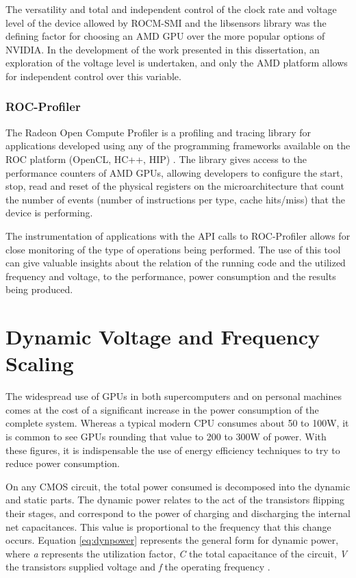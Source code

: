 The versatility and total and independent control of the clock rate and voltage level of the device allowed by ROCM-SMI and the libsensors library was the defining factor for choosing an AMD GPU over the more popular options of NVIDIA. In the development of the work presented in this dissertation, an exploration of the voltage level is undertaken, and only the AMD platform allows for independent control over this variable.

\subsubsection{ROC-Profiler}

The Radeon Open Compute Profiler \cite{noauthor_rocm-developer-tools/rocprofiler_2019} is a profiling and tracing library for applications developed using any of the programming frameworks available on the ROC platform (OpenCL, HC++, HIP) \cite{sun_evaluating_2018}. The library gives access to the performance counters of AMD GPUs, allowing developers to configure the start, stop, read and reset of the physical registers on the microarchitecture that count the number of events (number of instructions per type, cache hits/miss) that the device is performing.

The instrumentation of applications with the API calls to ROC-Profiler allows for close monitoring of the type of operations being performed. The use of this tool can give valuable insights about the relation of the running code and the utilized frequency and voltage, to the performance, power consumption and the results being produced.




\section{Dynamic Voltage and Frequency Scaling}
\label{section:dcvf}

The widespread use of GPUs in both supercomputers and on personal machines comes at the cost of a significant increase in the power consumption of the complete system. Whereas a typical modern CPU consumes about 50 to 100W, it is common to see GPUs rounding that value to 200 to 300W of power. With these figures, it is indispensable the use of energy efficiency techniques to try to reduce power consumption.

On any CMOS circuit, the total power consumed is decomposed into the dynamic and static parts. The dynamic power relates to the act of the transistors flipping their stages, and correspond to the power of charging and discharging the internal net capacitances. This value is proportional to the frequency that this change occurs. Equation \ref{eq:dynpower} represents the general form for dynamic power, where \textit{a} represents the utilization factor, \textit{C} the total capacitance of the circuit, \textit{V} the transistors supplied voltage and \textit{f} the operating frequency \cite{gonzalez_supply_1997}.

